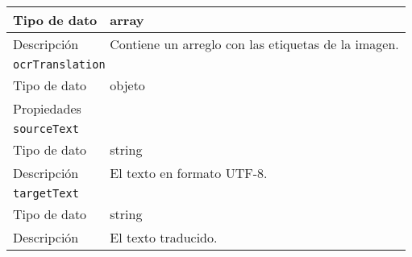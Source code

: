 \begin{longtable}{|l|l|}
Tipo de dato                                  & array                                                                                                                                          \\ \hline
Descripción                                   & Contiene un arreglo con las etiquetas de la imagen.                                                                                            \\ \hline
\multicolumn{2}{|l|}{\cellcolor[HTML]{68CBD0}\texttt{ocrTranslation}}                                                                                                                          \\ \hline
\cellcolor[HTML]{FFFFFF}Tipo de dato          & objeto                                                                                                                                         \\ \hline
\multicolumn{2}{|l|}{\cellcolor[HTML]{FFFFFF}Propiedades}                                                                                                                                      \\ \hline
\multicolumn{2}{|l|}{\texttt{sourceText}}                                                                                                                                                      \\ \hline
Tipo de dato                                  & string                                                                                                                                         \\ \hline
Descripción                                   & El texto en formato UTF-8.                                                                                                                     \\ \hline
\multicolumn{2}{|l|}{\texttt{targetText}}                                                                                                                                                      \\ \hline
Tipo de dato                                  & string                                                                                                                                         \\ \hline
Descripción                                   & El texto traducido.                                                                                                                            \\ \hline

\end{longtable}
